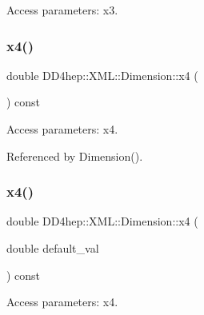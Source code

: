 Access parameters\+: x3. 

\hypertarget{struct_d_d4hep_1_1_x_m_l_1_1_dimension_a0d574d20118812741b1a070e878095cd}{}\label{struct_d_d4hep_1_1_x_m_l_1_1_dimension_a0d574d20118812741b1a070e878095cd} 
\subsubsection{\texorpdfstring{x4()}{x4()}\hspace{0.1cm}{\footnotesize\ttfamily [1/2]}}
{\footnotesize\ttfamily double D\+D4hep\+::\+X\+M\+L\+::\+Dimension\+::x4 (\begin{DoxyParamCaption}{ }\end{DoxyParamCaption}) const}



Access parameters\+: x4. 



Referenced by Dimension().

\hypertarget{struct_d_d4hep_1_1_x_m_l_1_1_dimension_ae1c6ca419eaaa0870a25d11dad91f653}{}\label{struct_d_d4hep_1_1_x_m_l_1_1_dimension_ae1c6ca419eaaa0870a25d11dad91f653} 
\subsubsection{\texorpdfstring{x4()}{x4()}\hspace{0.1cm}{\footnotesize\ttfamily [2/2]}}
{\footnotesize\ttfamily double D\+D4hep\+::\+X\+M\+L\+::\+Dimension\+::x4 (\begin{DoxyParamCaption}\item[{double}]{default\+\_\+val }\end{DoxyParamCaption}) const}



Access parameters\+: x4. 

\hypertarget{struct_d_d4hep_1_1_x_m_l_1_1_dimension_a9356efb69b92e1e6fab987b6f7d3ebc0}{}\label{struct_d_d4hep_1_1_x_m_l_1_1_dimension_a9356efb69b92e1e6fab987b6f7d3ebc0} 
